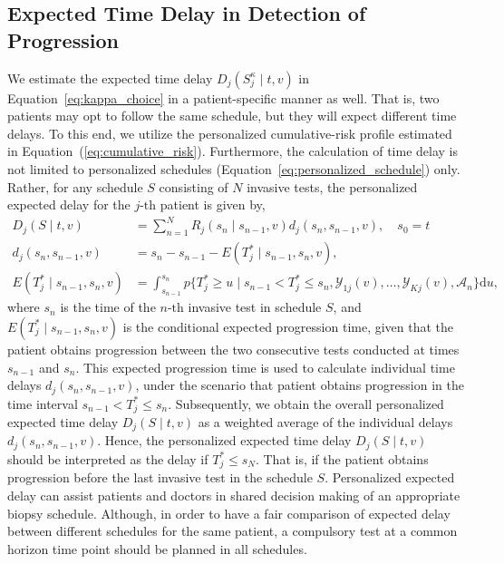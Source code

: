 \subsection{Expected Time Delay in Detection of Progression}
\label{subsec:exp_delay_estimation}
We estimate the expected time delay $D_j(S_j^{\kappa} \mid t, v)$ in Equation~\ref{eq:kappa_choice} in a patient-specific manner as well. That is, two patients may opt to follow the same schedule, but they will expect different time delays. To this end, we utilize the personalized cumulative-risk profile estimated in Equation~(\ref{eq:cumulative_risk}). Furthermore, the calculation of time delay is not limited to personalized schedules (Equation~\ref{eq:personalized_schedule}) only. Rather, for any schedule $S$ consisting of $N$ invasive tests, the personalized expected delay for the ${j\mbox{-th}}$ patient is given by,
\begin{equation}
\label{eq:expected_delay}
\begin{split}
D_j(S \mid t, v) &= \sum_{n=1}^{N} R_j(s_n \mid s_{n-1}, v) d_j(s_n, s_{n-1}, v), \quad s_0 = t\\
d_j(s_n, s_{n-1}, v) &= s_n - s_{n-1} - E(T^*_j \mid s_{n-1}, s_n, v),\\
E(T^*_j \mid s_{n-1}, s_n, v) &= \int_{s_{n-1}}^{s_n} p\Big\{T^*_j \geq u \mid s_{n-1} < T^*_j \leq s_n, \mathcal{Y}_{1j}(v), \ldots, \mathcal{Y}_{Kj}(v), \mathcal{A}_n\Big\} \mathrm{d}u,
\end{split}
\end{equation}
where $s_n$ is the time of the ${n\mbox{-th}}$ invasive test in schedule $S$, and ${E(T^*_j \mid s_{n-1}, s_n, v)}$ is the conditional expected progression time, given that the patient obtains progression between the two consecutive tests conducted at times $s_{n-1}$ and $s_n$. This expected progression time is used to calculate individual time delays $d_j(s_n, s_{n-1}, v)$, under the scenario that patient obtains progression in the time interval $s_{n-1} < T^*_j \leq s_n$. Subsequently, we obtain the overall personalized expected time delay $D_j(S \mid t, v)$ as a weighted average of the individual delays $d_j(s_n, s_{n-1}, v)$. Hence, the personalized expected time delay $D_j(S \mid t, v)$ should be interpreted as the delay if $T^*_j \leq s_N$. That is, if the patient obtains progression before the last invasive test in the schedule $S$. Personalized expected delay can assist patients and doctors in shared decision making of an appropriate biopsy schedule. Although, in order to have a fair comparison of expected delay between different schedules for the same patient, a compulsory test at a common horizon time point should be planned in all schedules.